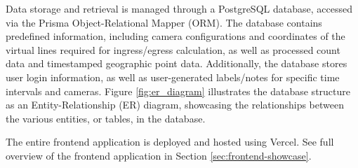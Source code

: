 Data storage and retrieval is managed through a PostgreSQL database, accessed via the Prisma Object-Relational Mapper (ORM). The database contains predefined information, including camera configurations and coordinates of the virtual lines required for ingress/egress calculation, as well as processed count data and timestamped geographic point data. Additionally, the database stores user login information, as well as user-generated labels/notes for specific time intervals and cameras. Figure \ref{fig:er_diagram} illustrates the database structure as an Entity-Relationship (ER) diagram, showcasing the relationships between the various entities, or tables, in the database.

The entire frontend application is deployed and hosted using Vercel. See full overview of the frontend application in Section \ref{sec:frontend-showcase}.

